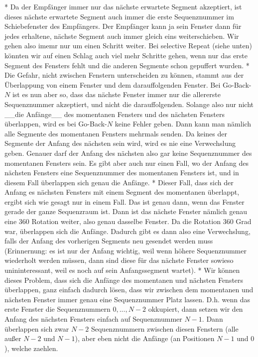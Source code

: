 * Da der Empfänger immer nur das nächste erwartete Segment akzeptiert, ist
  dieses nächste erwartete Segment auch immer die erste Sequenznummer im
  Schiebefenster des Empfängers. Der Empfänger kann ja sein Fenster dann für
  jedes erhaltene, nächste Segment auch immer gleich eins weiterschieben. Wir
  gehen also imemr nur um einen Schritt weiter. Bei selective Repeat (siehe
  unten) könnten wir auf einen Schlag auch viel mehr Schritte gehen, wenn nur
  das erste Segment des Fensters fehlt und die anderen Segmente schon gepuffert
  wurden.
* Die Gefahr, nicht zwischen Fenstern unterscheiden zu können, stammt aus der
  Überlappung von einem Fenster und dem darauffolgenden Fenster. Bei Go-Back-$N$
  ist es nun aber so, dass das nächste Fenster immer nur die allererste
  Sequenznummer akzeptiert, und nicht die darauffolgenden. Solange also nur
  nicht __die Anfänge__ des momentanen Fensters und des nächsten Fensters
  überlappen, wird es bei Go-Back-$N$ keine Fehler geben. Dann kann man nämlich
  alle Segmente des momentanen Fensters mehrmals senden. Da keines der Segmente
  der Anfang des nächsten sein wird, wird es nie eine Verwechslung
  geben. Genauer darf der Anfang des nächsten also gar keine Sequenznummer des
  momentanen Fensters sein. Es gibt aber auch nur einen Fall, wo der Anfang des
  nächsten Fensters eine Sequenznummer des momentanen Fensters ist, und in
  diesem Fall überlappen sich genau die Anfänge.
* Dieser Fall, dass sich der Anfang es nächsten Fensters mit einem Segment des
  momentanen überlappt, ergibt sich wie gesagt nur in einem Fall. Das ist genau
  dann, wenn das Fenster gerade der ganze Sequenzraum ist. Dann ist das nächste
  Fenster nämlich genau eine 360 Rotation weiter, also genau dasselbe
  Fenster. Da die Rotation 360 Grad war, überlappen sich die Anfänge. Dadurch
  gibt es dann also eine Verwechslung, falls der Anfang des vorherigen Segments
  neu gesendet werden muss (Erinnernung: es ist nur der Anfang wichtig, weil
  wenn höhere Sequenznummer wiederholt werden müssen, dann sind diese für das
  nächste Fenster sowieso unininteressant, weil es noch auf sein Anfangssegment
  wartet).
* Wir können dieses Problem, dass sich die Anfänge des momentanen und nächsten
  Fensters überlappen, ganz einfach dadurch lösen, dass wir zwischen dem
  momentanen und nächsten Fenster immer genau eine Sequenznummer Platz
  lassen. D.h. wenn das erste Fenster die Sequenznummern $0, ..., N - 2$
  okkupiert, dann setzen wir den Anfang des nächsten Fensters einfach auf
  Sequenznummer $N - 1$. Dann überlappen sich zwar $N - 2$ Sequenznummern
  zwischen diesen Fenstern (alle außer $N - 2$ und $N - 1$), aber eben nicht die
  Anfänge (an Positionen $N - 1$ und $0$), welche zaehlen.

